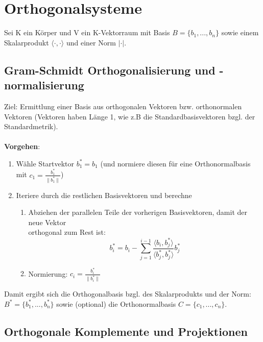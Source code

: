 \documentclass[10pt,a4paper]{article}
\newcommand{\norm}[1]{\lVert#1\rVert}
\begin{document}
	\newpage
	\section{Orthogonalsysteme}
	\label{os:sec:orthogonalsysteme}
	
	Sei K ein Körper und V ein K-Vektorraum mit Basis $B = \{b_1, ..., b_n\}$ sowie einem Skalarprodukt $\langle \cdot, \cdot\rangle$ und einer Norm $|\cdot|$.
	
	\subsection{Gram-Schmidt Orthogonalisierung und -normalisierung}
	\label{os:sub:gram_schmidt_orthogonalisierung_und_normalisierung}
	
	Ziel: Ermittlung einer Basis aus orthogonalen Vektoren bzw. orthonormalen Vektoren (Vektoren haben Länge 1, wie z.B die Standardbasisvektoren bzgl. der Standardmetrik).\\\\
	\textbf{Vorgehen}:
	\begin{enumerate}
		\item Wähle Startvektor $b^*_1 = b_1$ (und normiere diesen für eine Orthonormalbasis mit $c_1 =  \frac{b^*_1}{\norm{b^*_1}}$)
		\item Iteriere durch die restlichen Basisvektoren und berechne
		\begin{enumerate}
			\item Abziehen der parallelen Teile der vorherigen Basisvektoren, damit der neue Vektor\\orthogonal zum Rest ist: $$b^*_i = b_i - \sum_{j = 1}^{i - 1} \frac{\langle b_i, b^*_j\rangle}{\langle b^*_j, b^*_j\rangle}b^*_j$$\vspace*{-0.6cm}
			\item Normierung: $c_i = \frac{b^*_i}{\norm{b^*_i}}$
		\end{enumerate}
	\end{enumerate}
	Damit ergibt sich die Orthogonalbasis bzgl. des Skalarprodukts und der Norm: $B^* = \{b^*_1, ..., b^*_n\}$ sowie (optional) die Orthonormalbasis $C = \{c_1, ..., c_n\}$.
	
	\subsection{Orthogonale Komplemente und Projektionen}
	\label{os:sub:orthogonale_komplemente_und_projektionen}
	
\end{document}
